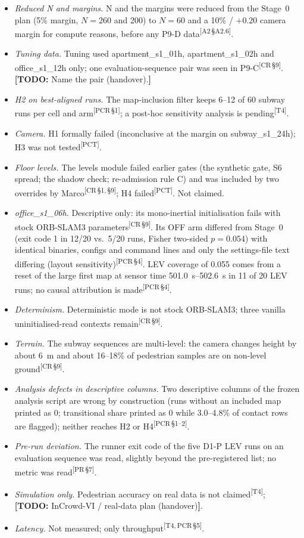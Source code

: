 \documentclass[journal]{IEEEtran}
\newcommand{\TODO}[1]{{\color{red}\textbf{[TODO:} #1\textbf{]}}}
\newcommand{\src}[1]{\textsuperscript{\color{blue}\scriptsize[#1]}}
\begin{document}
\begin{itemize}
  \item \emph{Reduced N and margins.} N and the margins were reduced from the
  Stage~0 plan (5\% margin, $N=260$ and 200) to $N=60$ and a 10\% / $+0.20$
  camera margin for compute reasons, before any P9-D data\src{A2\,\S A2.6}.
  \item \emph{Tuning data.} Tuning used apartment\_s1\_01h, apartment\_s1\_02h
  and office\_s1\_12h only; one evaluation-sequence pair was seen in
  P9-C\src{CR\,\S9}. \TODO{Name the pair (handover).}
  \item \emph{H2 on best-aligned runs.} The map-inclusion filter keeps 6--12 of
  60 subway runs per cell and arm\src{PCR\,\S1}; a post-hoc sensitivity
  analysis is pending\src{T4}.
  \item \emph{Camera.} H1 formally failed (inconclusive at the margin on
  subway\_s1\_24h); H3 was not tested\src{PCT}.
  \item \emph{Floor levels.} The levels module failed earlier gates (the
  synthetic gate, S6 spread; the shadow check; re-admission rule C) and was
  included by two overrides by Marco\src{CR\,\S1,\,\S9}; H4
  failed\src{PCT}. Not claimed.
  \item \emph{office\_s1\_06h.} Descriptive only: its mono-inertial
  initialisation fails with stock ORB-SLAM3 parameters\src{CR\,\S9}. Its OFF arm
  differed from Stage~0 (exit code 1 in 12/20 vs.\ 5/20 runs, Fisher two-sided
  $p=0.054$) with identical binaries, configs and command lines and only the
  settings-file text differing (layout sensitivity)\src{PCR\,\S4}. LEV
  coverage of 0.055 comes from a reset of the large first map at sensor time
  \SIrange{501.0}{502.6}{\second} in 11 of 20 LEV runs; no causal attribution is
  made\src{PCR\,\S4}.
  \item \emph{Determinism.} Deterministic mode is not stock ORB-SLAM3; three
  vanilla uninitialised-read contexts remain\src{CR\,\S9}.
  \item \emph{Terrain.} The subway sequences are multi-level: the camera
  changes height by about \SI{6}{\metre} and about 16--18\% of pedestrian
  samples are on non-level ground\src{CR\,\S9}.
  \item \emph{Analysis defects in descriptive columns.} Two descriptive columns
  of the frozen analysis script are wrong by construction (runs without an
  included map printed as 0; transitional share printed as 0 while 3.0--4.8\%
  of contact rows are flagged); neither reaches H2 or H4\src{PCR\,\S1--2}.
  \item \emph{Pre-run deviation.} The runner exit code of the five D1-P LEV runs
  on an evaluation sequence was read, slightly beyond the pre-registered
  list; no metric was read\src{PR\,\S7}.
  \item \emph{Simulation only.} Pedestrian accuracy on real data is not
  claimed\src{T4}; \TODO{InCrowd-VI / real-data plan (handover)}.
  \item \emph{Latency.} Not measured; only throughput\src{T4,\,PCR\,\S5}.
\end{itemize}
\end{document}
